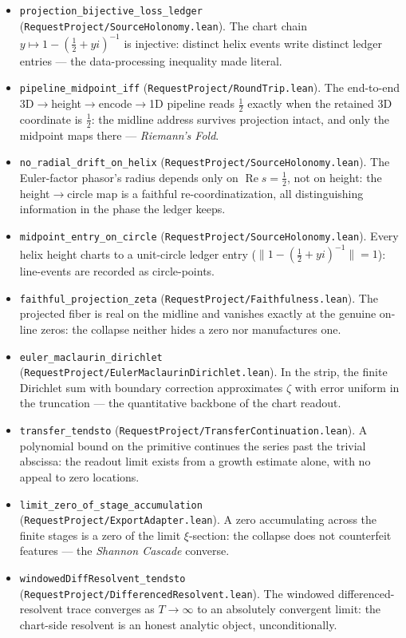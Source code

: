\documentclass[11pt]{article}
\theoremstyle{definition}
\renewcommand{\Re}{\operatorname{Re}}
\begin{document}
\begin{itemize}
Without the ledger the geometric projection is provably non-injective ---
the ledger does real work; the faithfulness results are not vacuous.
\item \texttt{projection\_bijective\_loss\_ledger}
(\texttt{RequestProject/SourceHolonomy.lean}). The chart chain
\(y\mapsto1-(\tfrac12+yi)^{-1}\) is injective: distinct helix events write
distinct ledger entries --- the data-processing inequality made literal.
\item \texttt{pipeline\_midpoint\_iff}
(\texttt{RequestProject/RoundTrip.lean}). The end-to-end
3D\(\to\)height\(\to\)encode\(\to\)1D pipeline reads \(\tfrac12\) exactly
when the retained 3D coordinate is \(\tfrac12\): the midline address
survives projection intact, and only the midpoint maps there --- \emph{Riemann's Fold}.
\item \texttt{no\_radial\_drift\_on\_helix}
(\texttt{RequestProject/SourceHolonomy.lean}). The Euler-factor phasor's
radius depends only on \(\Re s=\tfrac12\), not on height: the
height\(\to\)circle map is a faithful re-coordinatization, all
distinguishing information in the phase the ledger keeps.
\item \texttt{midpoint\_entry\_on\_circle}
(\texttt{RequestProject/SourceHolonomy.lean}). Every helix height charts to
a unit-circle ledger entry (\(\|1-(\tfrac12+yi)^{-1}\|=1\)): line-events are
recorded as circle-points.
\item \texttt{faithful\_projection\_zeta}
(\texttt{RequestProject/Faithfulness.lean}). The projected fiber is real on
the midline and vanishes exactly at the genuine on-line zeros: the collapse
neither hides a zero nor manufactures one.
\item \texttt{euler\_maclaurin\_dirichlet}
(\texttt{RequestProject/EulerMaclaurinDirichlet.lean}). In the strip, the
finite Dirichlet sum with boundary correction approximates \(\zeta\) with
error uniform in the truncation --- the quantitative backbone of the chart
readout.
\item \texttt{transfer\_tendsto}
(\texttt{RequestProject/TransferContinuation.lean}). A polynomial bound on
the primitive continues the series past the trivial abscissa: the readout
limit exists from a growth estimate alone, with no appeal to zero locations.
\item \texttt{limit\_zero\_of\_stage\_accumulation}
(\texttt{RequestProject/ExportAdapter.lean}). A zero accumulating across the
finite stages is a zero of the limit \(\xi\)-section: the collapse does not
counterfeit features --- the \emph{Shannon Cascade} converse.
\item \texttt{windowedDiffResolvent\_tendsto}
(\texttt{RequestProject/DifferencedResolvent.lean}). The windowed
differenced-resolvent trace converges as \(T\to\infty\) to an absolutely
convergent limit: the chart-side resolvent is an honest analytic object,
unconditionally.
\end{itemize}
\end{document}
